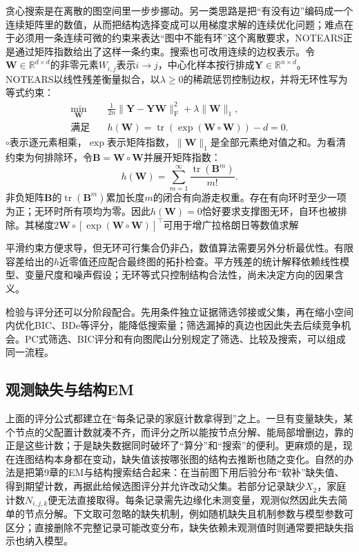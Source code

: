 贪心搜索是在离散的图空间里一步步挪动。另一类思路是把“有没有边”编码成一个连续矩阵里的数值，从而把结构选择变成可以用梯度求解的连续优化问题；难点在于必须用一条连续可微的约束来表达“图中不能有环”这个离散要求，NOTEARS正是通过矩阵指数给出了这样一条约束。搜索也可改用连续的边权表示。令$\bm{W}\in\mathbb{R}^{d\times d}$的非零元素$W_{i,j}$表示$i\to j$，中心化样本按行排成$\bm{Y}\in\mathbb{R}^{n\times d}$。NOTEARS以线性残差衡量拟合，以$\lambda\geq0$的稀疏惩罚控制边权，并将无环性写为等式约束：
\begin{equation}
  \begin{aligned}
    \min_{\bm{W}}\quad&
      \frac{1}{2n}\lVert\bm{Y}-\bm{Y}\bm{W}\rVert_{\mathrm F}^{2}
      +\lambda\lVert\bm{W}\rVert_1,\\
    \text{满足}\quad&
      h(\bm{W})=
      \operatorname{tr}\!\left(\exp(\bm{W}\circ\bm{W})\right)-d=0.
  \end{aligned}
  \label{eq:pgm-structure-learning-notears}
\end{equation}
$\circ$表示逐元素相乘，$\exp$表示矩阵指数，$\lVert\bm{W}\rVert_1$是全部元素绝对值之和。为看清约束为何排除环，令$\bm{B}=\bm{W}\circ\bm{W}$并展开矩阵指数：
\[
  h(\bm{W})=\sum_{m=1}^{\infty}
     \frac{\operatorname{tr}(\bm{B}^m)}{m!}.
\]
非负矩阵$\bm{B}$的$\operatorname{tr}(\bm{B}^m)$累加长度$m$的闭合有向游走权重。存在有向环时至少一项为正；无环时所有项均为零。因此$h(\bm{W})=0$恰好要求支撑图无环，自环也被排除。其梯度$2\bm{W}\circ[\exp(\bm{W}\circ\bm{W})]^{\top}$可用于增广拉格朗日等数值求解

平滑约束方便求导，但无环可行集合仍非凸，数值算法需要另外分析最优性。有限容差给出的$h$近零值还应配合最终图的拓扑检查。平方残差的统计解释依赖线性模型、变量尺度和噪声假设；无环等式只控制结构合法性，尚未决定方向的因果含义。

检验与评分还可以分阶段配合。先用条件独立证据筛选邻接或父集，再在缩小空间内优化BIC、BDe等评分，能降低搜索量；筛选漏掉的真边也因此失去后续竞争机会。PC式筛选、BIC评分和有向图爬山分别规定了筛选、比较及搜索，可以组成同一流程。

\subsection{观测缺失与结构EM}
\label{sec:pgm-structure-learning-structural-em}

上面的评分公式都建立在“每条记录的家庭计数拿得到”之上。一旦有变量缺失，某个节点的父配置计数就凑不齐，而评分之所以能按节点分解、能局部增删边，靠的正是这些计数；于是缺失数据同时破坏了“算分”和“搜索”的便利。更麻烦的是，现在连图结构本身都在变动，缺失值该按哪张图的结构去推断也随之变化。自然的办法是把第9章的EM与结构搜索结合起来：在当前图下用后验分布“软补”缺失值、得到期望计数，再据此给候选图评分并允许改动父集。若部分记录缺少$X_2$，家庭计数$N_{i,j,k}$便无法直接取得。每条记录需先边缘化未测变量，观测似然因此失去简单的节点分解。下文取可忽略的缺失机制，例如随机缺失且机制参数与模型参数可区分；直接删除不完整记录可能改变分布，缺失依赖未观测值时则通常要把缺失指示也纳入模型。

